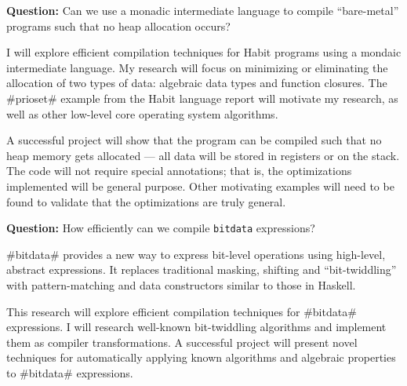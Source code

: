 \documentclass[11pt]{article}
\newcommand{\Ques}[1]{\noindent%
\textbf{Question:} #1}
\begin{document}
\VerbatimFootnotes
\DefineShortVerb{\#}
\doublespacing

\Ques{Can we use a monadic intermediate language to compile
  ``bare-metal'' programs such that no heap allocation occurs?}

\bigskip

I will explore efficient compilation techniques for Habit programs
using a mondaic intermediate language. My research will focus on
minimizing or eliminating the allocation of two types of data:
algebraic data types and function closures. The #prioset# example from
the Habit language report will motivate my research, as well as other
low-level core operating system algorithms.

A successful project will show that the program can be compiled such
that no heap memory gets allocated --- all data will be stored in
registers or on the stack. The code will not require special
annotations; that is, the optimizations implemented will be general
purpose. Other motivating examples will need to be found to validate
that the optimizations are truly general.

\bigskip

\Ques{How efficiently can we compile \Verb=bitdata= expressions?}

#bitdata# provides a new way to express bit-level operations using
high-level, abstract expressions. It replaces traditional masking,
shifting and ``bit-twiddling'' with pattern-matching and data
constructors similar to those in Haskell. 

This research will explore efficient compilation techniques for #bitdata#
expressions. I will research well-known bit-twiddling algorithms and implement
them as compiler transformations. A successful project will present novel 
techniques for automatically applying known algorithms and algebraic properties
to #bitdata# expressions.
\end{document}
